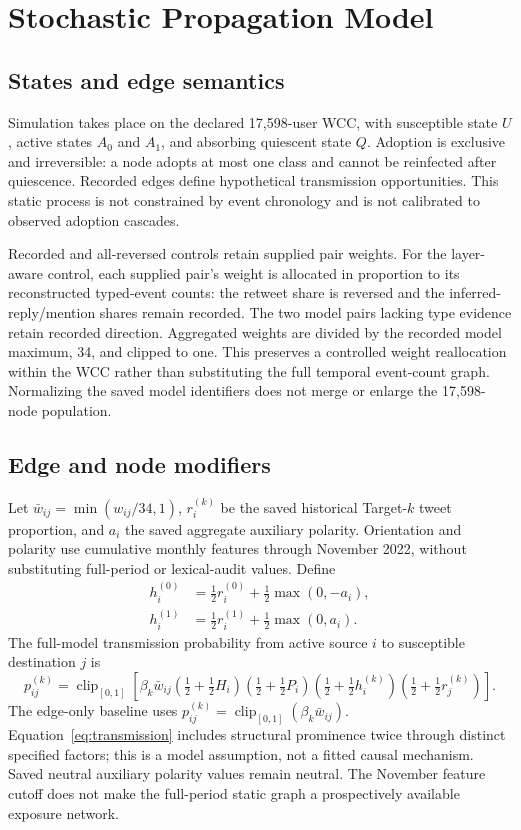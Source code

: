 \documentclass[11pt,a4paper]{article}
\begin{document}
\section{Stochastic Propagation Model}
\subsection{States and edge semantics}
Simulation takes place on the declared 17,598-user WCC, with susceptible state $U$, active states $A_0$ and $A_1$, and absorbing quiescent state $Q$. Adoption is exclusive and irreversible: a node adopts at most one class and cannot be reinfected after quiescence. Recorded edges define hypothetical transmission opportunities. This static process is not constrained by event chronology and is not calibrated to observed adoption cascades.

Recorded and all-reversed controls retain supplied pair weights. For the layer-aware control, each supplied pair's weight is allocated in proportion to its reconstructed typed-event counts: the retweet share is reversed and the inferred-reply/mention shares remain recorded. The two model pairs lacking type evidence retain recorded direction. Aggregated weights are divided by the recorded model maximum, 34, and clipped to one. This preserves a controlled weight reallocation within the WCC rather than substituting the full temporal event-count graph. Normalizing the saved model identifiers does not merge or enlarge the 17,598-node population.

\subsection{Edge and node modifiers}
Let $\bar w_{ij}=\min(w_{ij}/34,1)$, $r_i^{(k)}$ be the saved historical Target-$k$ tweet proportion, and $a_i$ the saved aggregate auxiliary polarity. Orientation and polarity use cumulative monthly features through November 2022, without substituting full-period or lexical-audit values. Define
\begin{align}
h_i^{(0)}&=\tfrac12 r_i^{(0)}+\tfrac12\max(0,-a_i),\\
h_i^{(1)}&=\tfrac12 r_i^{(1)}+\tfrac12\max(0,a_i).
\end{align}
The full-model transmission probability from active source $i$ to susceptible destination $j$ is
\begin{equation}\label{eq:transmission}
p_{ij}^{(k)}=\operatorname{clip}_{[0,1]}\!\left[
\beta_k\bar w_{ij}
\left(\tfrac12+\tfrac12H_i\right)
\left(\tfrac12+\tfrac12P_i\right)
\left(\tfrac12+\tfrac12h_i^{(k)}\right)
\left(\tfrac12+\tfrac12r_j^{(k)}\right)\right].
\end{equation}
The edge-only baseline uses $p_{ij}^{(k)}=\operatorname{clip}_{[0,1]}(\beta_k\bar w_{ij})$. Equation~\ref{eq:transmission} includes structural prominence twice through distinct specified factors; this is a model assumption, not a fitted causal mechanism. Saved neutral auxiliary polarity values remain neutral. The November feature cutoff does not make the full-period static graph a prospectively available exposure network.
\end{document}
